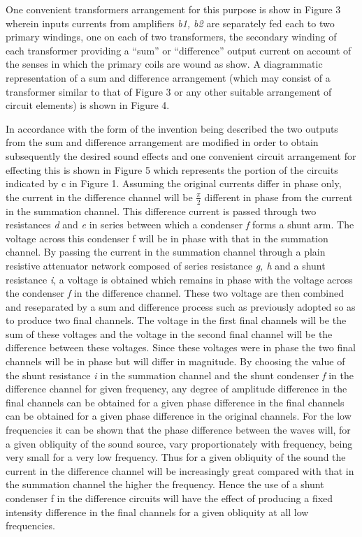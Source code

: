 \documentclass[11pt]{article}
\begin{document}
\begin{multicols*}{2}
One convenient transformers arrangement for this purpose is show in Figure 3 wherein inputs currents from amplifiers \textit{b1, b2} are separately fed each to two primary windings, one on each of two transformers, the secondary winding of each transformer providing a “sum” or “difference” output current on account of the senses in which the primary coils are wound as show. A diagrammatic representation of a sum and difference arrangement (which may consist of a transformer similar to that of Figure 3 or any other suitable arrangement of circuit elements) is shown in Figure 4.

In accordance with the form of the invention being described the two outputs from the sum and difference arrangement are modified in order to obtain subsequently the desired sound effects and one convenient circuit arrangement for effecting this is shown in Figure 5 which represents the portion of the circuits indicated by c in Figure 1. Assuming the original currents differ in phase only, the current in the difference channel will be $\frac{\pi}{2}$ different in phase from the current in the summation channel. This difference current is passed through two resistances \textit{d} and \textit{e} in series between which a condenser \textit{f} forms a shunt arm. The voltage across this condenser {f} will be in phase with that in the summation channel. By passing the current in the summation channel through a plain resistive attenuator network composed of series resistance \textit{g, h} and a shunt resistance \textit{i}, a voltage is obtained which remains in phase with the voltage across the condenser \textit{f} in the difference channel. These two voltage are then combined and reseparated by a sum and difference process such as previously adopted so as to produce two final channels. The voltage in the first final channels will be the sum of these voltages and the voltage in the second final channel will be the difference between these voltages. Since these voltages were in phase the two final channels will be in phase but will differ in magnitude. By choosing the value of the shunt resistance \textit{i} in the summation channel and the shunt condenser \textit{f} in the difference channel for given frequency, any degree of amplitude difference in the final channels can be obtained for a given phase difference in the final channels can be obtained for a given phase difference in the original channels. For the low frequencies it can be shown that the phase difference between the waves will, for a given obliquity of the sound source, vary proportionately with frequency, being very small for a very low frequency. Thus for a given obliquity of the sound the current in the difference channel will be increasingly great compared with that in the summation channel the higher the frequency. Hence the use of a shunt condenser f in the difference circuits will have the effect of producing a fixed intensity difference in the final channels for a given obliquity at all low frequencies.


\end{multicols*}
\end{document}

